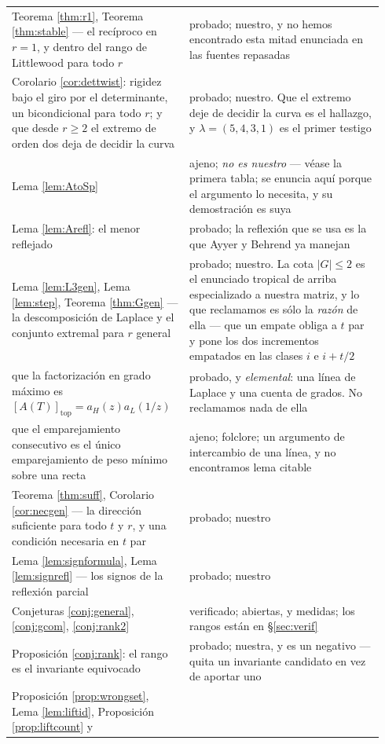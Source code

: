 \documentclass[11pt,reqno]{amsart}
\newcommand{\stproved}{\textcolor{hproved}{\small probado}}
\newcommand{\stverif}{\textcolor{hverif}{\small verificado}}
\newcommand{\stext}{\textcolor{hext}{\small ajeno}}
\theoremstyle{plain}
\theoremstyle{definition}
\begin{document}
\begin{longtable}{@{}>{\raggedright\arraybackslash}p{0.44\linewidth}%
                   >{\raggedright\arraybackslash}p{0.50\linewidth}@{}}
Teorema \ref{thm:r1}, Teorema \ref{thm:stable} --- el recíproco en $r=1$, y dentro del rango de
Littlewood para todo $r$ & \stproved; nuestro, y no hemos encontrado esta mitad enunciada en las fuentes repasadas\\
Corolario \ref{cor:dettwist}: rigidez bajo el giro por el determinante, un bicondicional para todo
$r$; y que desde $r\ge2$ el extremo de orden dos deja de decidir la curva &
\stproved; nuestro. Que el extremo deje de decidir la curva es el hallazgo, y $\lambda=(5,4,3,1)$ es
el primer testigo\\
Lema \ref{lem:AtoSp} & \stext; \emph{no es nuestro} --- véase la primera tabla; se enuncia aquí porque el
argumento lo necesita, y su demostración es suya\\
Lema \ref{lem:Arefl}: el menor reflejado & \stproved; la reflexión que se usa es la que Ayyer y
Behrend ya manejan\\
Lema \ref{lem:L3gen}, Lema \ref{lem:step}, Teorema \ref{thm:Ggen} --- la descomposición de Laplace y
el conjunto extremal para $r$ general & \stproved; nuestro. La cota $|G|\le2$ es el enunciado
tropical de arriba especializado a nuestra matriz, y lo que reclamamos es sólo la \emph{razón} de
ella --- que un empate obliga a $t$ par y pone los dos incrementos empatados en las clases $i$ e
$i+t/2$\\
que la factorización en grado máximo es $[A(T)]_{\mathrm{top}}=a_H(z)a_L(1/z)$ & \stproved, y
\emph{elemental}: una línea de Laplace y una cuenta de grados. No reclamamos nada de ella\\
que el emparejamiento consecutivo es el único emparejamiento de peso mínimo sobre una recta & \stext;
folclore; un argumento de intercambio de una línea, y no encontramos lema citable\\
Teorema \ref{thm:suff}, Corolario \ref{cor:necgen} --- la dirección suficiente para todo $t$ y $r$, y
una condición necesaria en $t$ par & \stproved; nuestro\\
Lema \ref{lem:signformula}, Lema \ref{lem:signrefl} --- los signos de la reflexión parcial &
\stproved; nuestro\\
Conjeturas \ref{conj:general}, \ref{conj:gcom}, \ref{conj:rank2} & \stverif; abiertas, y medidas; los rangos
están en \S\ref{sec:verif}\\
Proposición \ref{conj:rank}: el rango es el invariante equivocado & \stproved; nuestra, y es un
negativo --- quita un invariante candidato en vez de aportar uno\\
Proposición \ref{prop:wrongset}, Lema \ref{lem:liftid}, Proposición \ref{prop:liftcount} y

\end{longtable}
\end{document}
